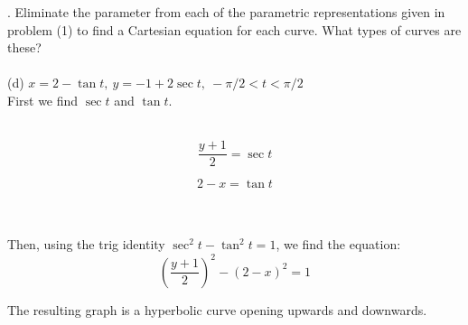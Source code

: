 \documentclass[11pt]{exam}
\begin{document}
. Eliminate the parameter from each of the parametric representations given in problem (1) to find a Cartesian equation for each curve. What types of curves are these? \\
\\
\indent (d) $x = 2 - \tan t,\ y = -1 + 2\sec t,\ -\pi/2 < t < \pi/2 $\\
\newline
\newline
First we find $\sec t$ and $\tan t$.\\
\\
\noindent\begin{minipage}{.5\linewidth}
\begin{equation*}
  \frac{y+1}{2}=\sec t
\end{equation*}
\end{minipage}%
\begin{minipage}{.5\linewidth}
\begin{equation*}
  2-x = \tan t
\end{equation*}
\end{minipage}
\\
\\
Then, using the trig identity $\sec^2 t - \tan^2 t = 1$, we find the equation:
$$\left(\frac{y+1}{2}\right)^2 - \left(2-x\right)^2 = 1$$

The resulting graph is a hyperbolic curve opening upwards and downwards. 
\end{document}
